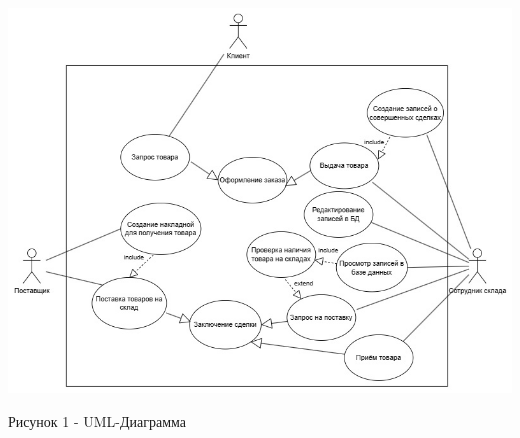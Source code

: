 \documentclass[14pt]{extreport}
\begin{document}
\begin{center}
    \includegraphics[width=1.0\linewidth]{UMLBD.jpg}

    Рисунок 1 - UML-Диаграмма
\end{center}
\end{document}
